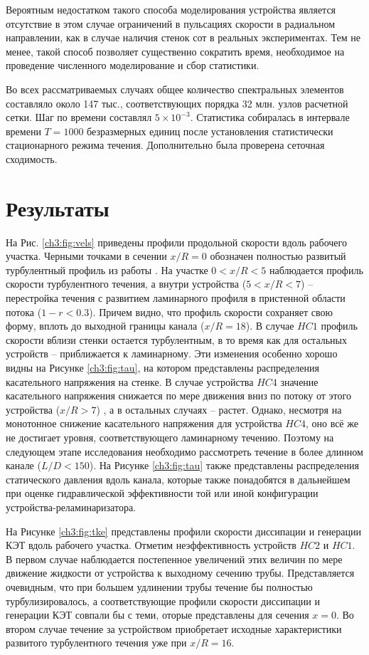 %
Вероятным недостатком такого способа моделирования устройства является отсутствие
 в этом случае ограничений в пульсациях скорости в радиальном направлении, 
как в случае наличия стенок сот в реальных экспериментах. 
%
Тем не менее, такой способ позволяет существенно сократить время, 
необходимое на проведение численного моделирование и сбор статистики.
%

Во всех рассматриваемых случаях общее количество спектральных элементов составляло около 147 тыс., 
соответствующих порядка 32 млн. узлов расчетной сетки. 
%
Шаг по времени составлял $5\times10^{-3}$. 
%
Статистика собиралась в интервале времени $T = 1000$ безразмерных единиц 
после установления статистически стационарного режима течения. 
%
Дополнительно была проверена сеточная сходимость.
%

\section{Результаты}\label{ch3:results}
%
На Рис. \ref{ch3:fig:vels} приведены профили продольной скорости вдоль рабочего участка. 
%
Черными точками в сечении $x/R = 0$ обозначен полностью развитый турбулентный 
профиль из работы \cite{el2014turbulent}. 
%
На участке $0 < x/R < 5$ наблюдается профиль скорости турбулентного течения, 
а внутри устройства ($5 < x/R < 7$) -- перестройка течения с развитием ламинарного профиля 
в пристенной области потока ($1-r < 0.3$). 
%
Причем видно, что профиль скорости сохраняет свою форму, вплоть до выходной границы канала ($x/R = 18$). 
%
В случае $HC1$ профиль скорости вблизи стенки остается турбулентным, 
в то время как для остальных устройств -- приближается к ламинарному. 
%
Эти изменения особенно хорошо видны на Рисунке \ref{ch3:fig:tau}, 
на котором представлены распределения касательного напряжения на стенке. 
%
В случае устройства $HC4$ значение касательного напряжения снижается 
по мере движения вниз по потоку от этого устройства ($x/R > 7$) , а в остальных случаях -- растет. 
%
Однако, несмотря на монотонное снижение касательного напряжения 
для устройства $HC4$, оно всё же не достигает уровня, соответствующего ламинарному течению. 
%
Поэтому на следующем этапе исследования необходимо рассмотреть течение в более длинном канале ($L/D < 150$). 
%
На Рисунке \ref{ch3:fig:tau} также представлены распределения статического давления вдоль канала, 
которые также понадобятся в дальнейшем при оценке гидравлической эффективности той или иной 
конфигурации устройства-реламинаризатора.
%


%
На Рисунке \ref{ch3:fig:tke} представлены профили скорости диссипации и генерации КЭТ вдоль рабочего участка. 
%
Отметим неэффективность устройств $HC2$ и $HC1$. 
%
В первом случае наблюдается постепенное увеличений этих величин по мере движение жидкости 
от устройства к выходному сечению трубы. 
%
Представляется очевидным, что при большем удлинении трубы течение бы полностью турбулизировалось, 
а соответствующие профили скорости диссипации и генерации КЭТ совпали бы с теми, 
оторые представлены для сечения $x = 0$. 
%
Во втором случае течение за устройством приобретает исходные характеристики развитого турбулентного течения 
уже при $x/R = 16$.
%



